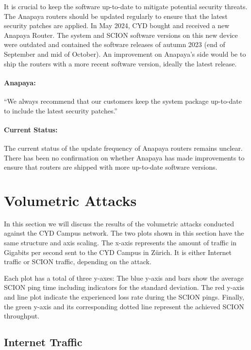 It is crucial to keep the software up-to-date to mitigate potential security threats.
The Anapaya routers should be updated regularly to ensure that the latest security patches are applied.
In May 2024, CYD bought and received a new Anapaya Router.
The system and SCION software versions on this new device were outdated and contained the software releases of autumn 2023 (end of September and mid of October).
An improvement on Anapaya's side would be to ship the routers with a more recent software version, ideally the latest release.

\begin{boxH}
\paragraph{Anapaya:}
``We always recommend that our customers keep the system package up-to-date to include the latest security patches.''
\end{boxH}

\paragraph{Current Status:}
The current status of the update frequency of Anapaya routers remains unclear.
There has been no confirmation on whether Anapaya has made improvements to ensure that routers are shipped with more up-to-date software versions.


\section{Volumetric Attacks}
\label{sec:volumetric-attacks}

In this section we will discuss the results of the volumetric attacks conducted against the CYD Campus network.
The two plots shown in this section have the same structure and axis scaling.
The x-axis represents the amount of traffic in Gigabits per second sent to the CYD Campus in Zürich.
It is either Internet traffic or SCION traffic, depending on the attack.

Each plot has a total of three y-axes:
The blue y-axis and bars show the average SCION ping time including indicators for the standard deviation.
The red y-axis and line plot indicate the experienced loss rate during the SCION pings.
Finally, the green y-axis and its corresponding dotted line represent the achieved SCION throughput.

\subsection{Internet Traffic}

